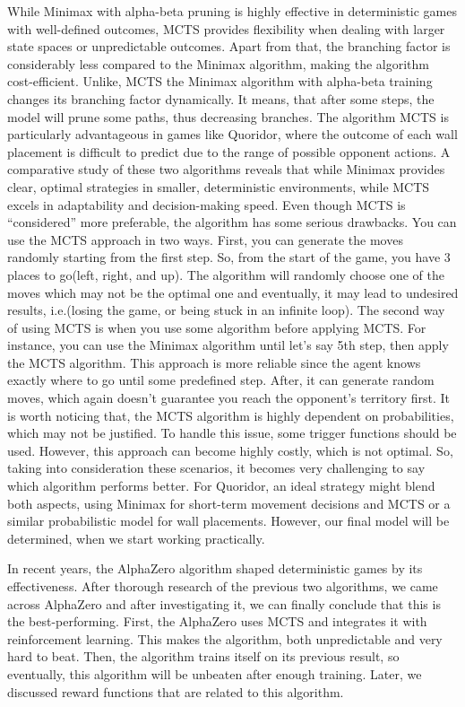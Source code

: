 \documentclass[12pt]{report}
\begin{document}
While Minimax with alpha-beta pruning is highly effective in deterministic games with well-defined outcomes, MCTS provides flexibility when dealing with larger state spaces or unpredictable outcomes. Apart from that, the branching factor is considerably less compared to the Minimax algorithm, making the algorithm cost-efficient. Unlike, MCTS the Minimax algorithm with alpha-beta training changes its branching factor dynamically. It means, that after some steps, the model will prune some paths, thus decreasing branches. The algorithm MCTS is particularly advantageous in games like Quoridor, where the outcome of each wall placement is difficult to predict due to the range of possible opponent actions. A comparative study of these two algorithms reveals that while Minimax provides clear, optimal strategies in smaller, deterministic environments,  while MCTS excels in adaptability and decision-making speed. Even though MCTS is “considered” more preferable, the algorithm has some serious drawbacks. You can use the MCTS approach in two ways. First, you can generate the moves randomly starting from the first step. So, from the start of the game, you have 3 places to go(left, right, and up). The algorithm will randomly choose one of the moves which may not be the optimal one and eventually, it may lead to undesired results, i.e.(losing the game, or being stuck in an infinite loop). The second way of using MCTS is when you use some algorithm before applying MCTS. For instance, you can use the Minimax algorithm until let's say 5th step, then apply the MCTS algorithm. This approach is more reliable since the agent knows exactly where to go until some predefined step. After, it can generate random moves, which again doesn’t guarantee you reach the opponent's territory first. It is worth noticing that, the MCTS algorithm is highly dependent on probabilities, which may not be justified. To handle this issue, some trigger functions should be used. However, this approach can become highly costly, which is not optimal. So, taking into consideration these scenarios, it becomes very challenging to say which algorithm performs better. For Quoridor, an ideal strategy might blend both aspects, using Minimax for short-term movement decisions and MCTS or a similar probabilistic model for wall placements. However, our final model will be determined, when we start working practically. 

In recent years, the AlphaZero algorithm shaped deterministic games by its effectiveness. After thorough research of the previous two algorithms, we came across AlphaZero and after investigating it, we can finally conclude that this is the best-performing. First, the AlphaZero uses MCTS and integrates it with reinforcement learning. This makes the algorithm, both unpredictable and very hard to beat. Then, the algorithm trains itself on its previous result, so eventually, this algorithm will be unbeaten after enough training. Later, we discussed reward functions that are related to this algorithm.  
\end{document}
